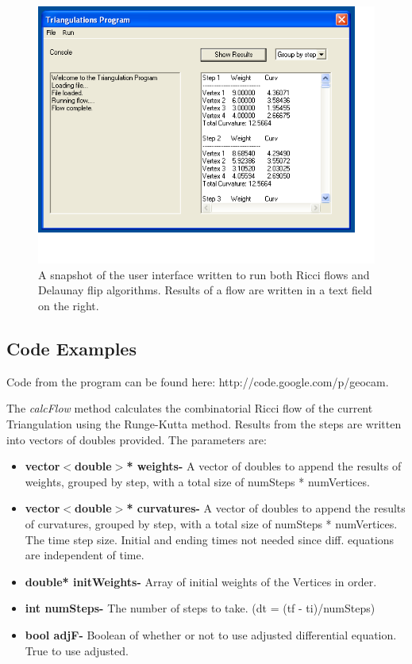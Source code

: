 \documentclass[12pt]{article}
\begin{document}
\begin{figure}
\begin{center}
\includegraphics[scale = 0.65]{Pictures/GUIpic.png}
\caption{A snapshot of the user interface written to run both Ricci flows and Delaunay flip algorithms. Results of a flow are written in a text field on the right.}
\end{center}
\end{figure}

\subsection{Code Examples}
Code from the program can be found here: http://code.google.com/p/geocam. 
 
The \textit{calcFlow} method calculates the combinatorial Ricci flow of the current Triangulation using the Runge-Kutta method. Results from the steps are written into vectors of doubles provided. The parameters are:

\begin{itemize}
\item\textbf{vector$<$double$>$* weights-} A vector of doubles to append the results of weights, grouped by step, with a total size of numSteps * numVertices.
\item\textbf{vector$<$double$>$* curvatures-} A vector of doubles to append the results of curvatures, grouped by step, with a total size of numSteps * numVertices. The time step size. Initial and ending times not needed since diff. equations are independent of time.
\item\textbf{double* initWeights-} Array of initial weights of the Vertices in order.
\item\textbf{int numSteps-} The number of steps to take. (dt = (tf - ti)/numSteps)
\item\textbf{bool adjF-} Boolean of whether or not to use adjusted differential equation. True to use adjusted.
\end{itemize}
\end{document}
